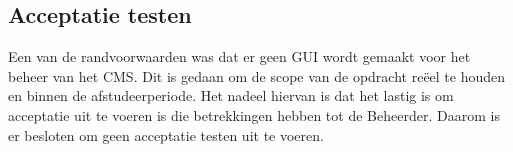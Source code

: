 \subsection{Acceptatie testen}
Een van de randvoorwaarden was dat er geen \gls{GUI} wordt gemaakt voor het beheer van het CMS.
Dit is gedaan om de scope van de opdracht reëel te houden en binnen de afstudeerperiode.
Het nadeel hiervan is dat het lastig is om acceptatie uit te voeren is die betrekkingen hebben tot de \gls{Beheerder}.
Daarom is er besloten om geen acceptatie testen uit te voeren.
